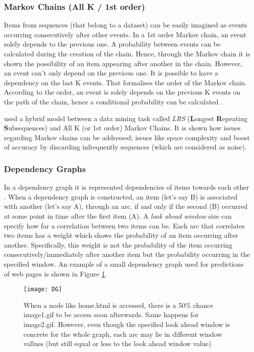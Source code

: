 \subsubsection{Markov Chains (All K / 1st order)}{\label{Markov}}
Items from sequences (that belong to a dataset) can be easily imagined as events occurring consecutively after other events. In a 1st order Markov chain, an event solely depends to the previous one. A probability between events can be calculated during the creation of the chain. Hence, through the Markov chain it is shown the possibility of an item appearing after another in the chain. However, an event can't only depend on the previous one. It is possible to have a dependency on the last K events. That formalises the order of the Markov chain. According to the order, an event is solely depends on the previous K events on the path of the chain, hence a conditional probability can be calculated \cite{Pitkow99mininglongest}.
\par \citeauthor{Pitkow99mininglongest} \citeyear{Pitkow99mininglongest} used a hybrid model between a data mining task called \emph{LRS} (\textbf{L}ongest \textbf{R}epeating \textbf{S}ubsequences) and All K (or 1st order) Markov Chains. It is shown how issues regarding Markov chains can be addressed; issues like space complexity and boost of accuracy by discarding infrequently sequences (which are considered as noise).
\subsubsection{Dependency Graphs}
In a dependency graph it is represented dependencies of items towards each other \cite{Padmanabhan:1996:UPP:235160.235164}. When a dependency graph is constructed, an item (let's say B) is associated with another (let's say A), through an arc, if and only if the second (B) occurred  at some point in time after the first item (A). A \emph{look ahead window} size can specify how far a correlation between two items can be. Each arc that correlates two items has a weight which shows the probability of an item occurring after another. Specifically, this weight is not the probability of the item occurring consecutively/immediately after another item but the probability occurring in the specified window. An example of a small dependency graph used for predictions of web pages is shown in Figure \ref{fig:DG}. 

\begin{figure}[h]
    \centering
    \texttt{[image: DG]}
    \caption{When a node like home.html is accessed, there is a 50\% chance image1.gif to be access soon afterwards. Same happens for image2.gif. However, even though the specified look ahead window is concrete for the whole graph, each arc may lie in different window vallues (but still equal or less to the look ahead window value)}
    \label{fig:DG}
\end{figure}

